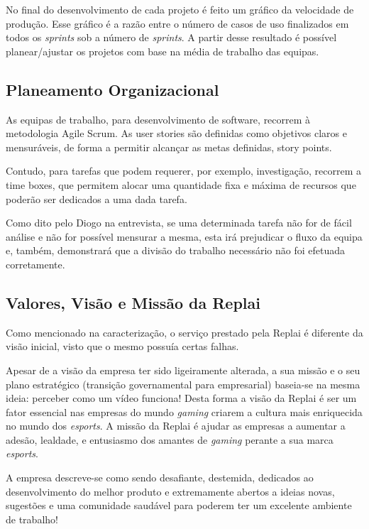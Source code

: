     No final do desenvolvimento de cada projeto é feito um gráfico da velocidade de produção. Esse gráfico é a razão entre o número de casos de uso finalizados em todos os \textit{sprints} sob a número de \textit{sprints}. A partir desse resultado é possível planear/ajustar os projetos com base na média de trabalho das equipas.

\subsection{Planeamento Organizacional}

As equipas de trabalho, para desenvolvimento de software, recorrem à metodologia Agile Scrum. As user stories são definidas como objetivos claros e mensuráveis, de forma a permitir alcançar as metas definidas, story points.
  
Contudo, para tarefas que podem requerer, por exemplo, investigação, recorrem a time boxes, que permitem alocar uma quantidade fixa e máxima de recursos que poderão ser dedicados a uma dada tarefa.
  
Como dito pelo Diogo na entrevista, se uma determinada tarefa não for de fácil análise e não for possível mensurar a mesma, esta irá prejudicar o fluxo da equipa e, também, demonstrará que a divisão do trabalho necessário não foi efetuada corretamente.


\subsection{Valores, Visão e Missão da Replai}

Como mencionado na caracterização, o serviço prestado pela Replai é diferente da visão inicial, visto que o mesmo possuía certas falhas.

Apesar de a visão da empresa ter sido ligeiramente alterada, a sua missão e o seu plano estratégico (transição governamental para empresarial) baseia-se na mesma ideia: perceber como um vídeo funciona! Desta forma a visão da Replai é ser um fator essencial nas empresas do mundo \textit{gaming} criarem a cultura mais enriquecida no mundo dos \textit{esports}. A missão da Replai é ajudar as empresas a aumentar a adesão, lealdade, e entusiasmo dos amantes de \textit{gaming} perante a sua marca \textit{esports}.

A empresa descreve-se como sendo desafiante, destemida, dedicados ao desenvolvimento do melhor produto e extremamente abertos a ideias novas, sugestões e uma comunidade saudável para poderem ter um excelente ambiente de trabalho!

